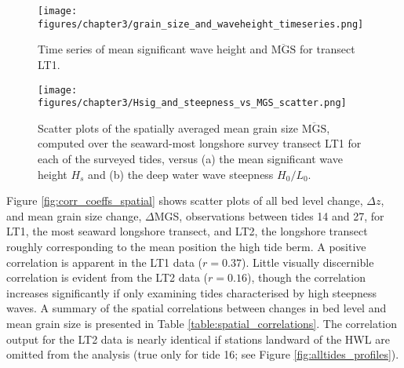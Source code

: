 \documentclass[jmse,article,submit,pdftex,moreauthors]{Definitions/mdpi}
\begin{document}
\begin{figure}[tbp] %
	\begin{center}
		\texttt{[image: figures/chapter3/grain\_size\_and\_waveheight\_timeseries.png]}
		\caption[Time series of mean significant wave height and mean surficial grian size]{Time series of mean significant wave height and $\overline{\mathrm{MGS}}$ for transect LT1.\label{fig:hsig_mgs}}
	\end{center}
\end{figure}

\begin{figure}[tbp] %
	\begin{center}
		\texttt{[image: figures/chapter3/Hsig\_and\_steepness\_vs\_MGS\_scatter.png]}
		\caption[Mean surfical grain size versus significant wave height, wave steepness]{Scatter plots of the spatially averaged mean grain size $\overline{\mathrm{MGS}}$, computed over the seaward-most longshore survey transect LT1 for each of the surveyed tides, versus (a) the mean significant wave height $H_s$ and (b) the deep water wave steepness $H_0/L_0$. \label{fig:hsig_steepness_mgs_scatter}}
	\end{center}
\end{figure}

Figure \ref{fig:corr_coeffs_spatial} shows scatter plots of all bed level change, $\Delta z$, and mean grain size change, $\Delta$MGS, observations between tides 14 and 27, for LT1, the most seaward longshore transect, and LT2, the longshore transect roughly corresponding to the mean position the high tide berm. A positive correlation is apparent in the LT1 data ($r=0.37$). Little visually discernible correlation is evident from the LT2 data ($r=0.16$), though the correlation increases significantly if only examining tides characterised by high steepness waves. A summary of the spatial correlations between changes in bed level and mean grain size is presented in Table \ref{table:spatial_correlations}. The correlation output for the LT2 data is nearly identical if stations landward of the HWL are omitted from the analysis (true only for tide 16; see Figure \ref{fig:alltides_profiles}).
\end{document}
